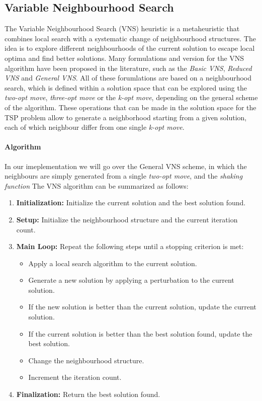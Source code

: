 \documentclass{article}
\begin{document}
\subsection{Variable Neighbourhood Search}
The Variable Neighbourhood Search (VNS) heuristic is a metaheuristic that combines local search with a systematic change of neighbourhood structures. 
The idea is to explore different neighbourhoods of the current solution to escape local optima and find better solutions.
Many formulations and version for the VNS algorithm have been proposed in the literature, such as the \textit{Basic VNS}, \textit{Reduced VNS} and \textit{General VNS}.\cite{VariableNeighborhood_Search}
All of these forumlations are based on a neighbourhood search, which is defined within a solution space that can be explored using the \textit{two-opt move}, 
\textit{three-opt move} or the \textit{k-opt move}, depending on the general scheme of the algorithm. These operations that can be made in the solution space for the TSP problem allow to generate a neighborhood
starting from a given solution, each of which neighbour differ from one single \textit{k-opt move}. \cite{Heuristics_for_the_Traveling_Salesman_Problem} 

\paragraph{Algorithm}
In our imeplementation we will go over the General VNS scheme, in which the neighbours are simply generated from a single \textit{two-opt move}, and the \textit{shaking function} 
The VNS algorithm can be summarized as follows:
\begin{enumerate}
	\item \textbf{Initialization:} Initialize the current solution and the best solution found.
	\item \textbf{Setup:} Initialize the neighbourhood structure and the current iteration count.
	\item \textbf{Main Loop:} Repeat the following steps until a stopping criterion is met:
		  \begin{itemize}
			  \item Apply a local search algorithm to the current solution.
			  \item Generate a new solution by applying a perturbation to the current solution.
			  \item If the new solution is better than the current solution, update the current solution.
			  \item If the current solution is better than the best solution found, update the best solution.
			  \item Change the neighbourhood structure.
			  \item Increment the iteration count.
		  \end{itemize}
	\item \textbf{Finalization:} Return the best solution found.
\end{enumerate}
\end{document}
